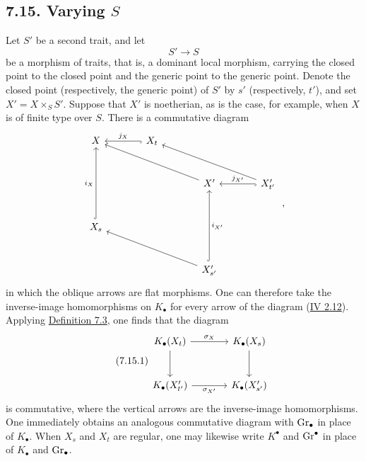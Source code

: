 \subsection*{7.15. Varying $S$}
Let $S'$ be a second trait, and let
\[
S'\longrightarrow S
\]
be a morphism of traits, that is, a dominant local morphism, carrying the
closed point to the closed point and the generic point to the generic point.
Denote the closed point (respectively, the generic point) of $S'$ by $s'$
(respectively, $t'$), and set $X'=X\times_SS'$. Suppose that $X'$ is
noetherian, as is the case, for example, when $X$ is of finite type over $S$.
There is a commutative diagram
\[
\begin{tikzcd}[column sep=large,row sep=large]
X & X_t \arrow[l,hook,"j_X"'] & & \\
& & X' \arrow[ull] & X'_{t'} \arrow[l,hook,"j_{X'}"'] \arrow[ull] \\
X_s \arrow[uu,hook,"i_X"] & & & \\
& & X'_{s'} \arrow[uu,hook,"i_{X'}"'] \arrow[ull] &
\end{tikzcd}
\;,
\]
in which the oblique arrows are flat morphisms. One can therefore take the
inverse-image homomorphisms on $K_\bullet$ for every arrow of the diagram
(\hyperlink{sga6.e04.para.2-12}{IV 2.12}). Applying \hyperlink{sga6.e10.prop.7-3}{Definition 7.3}, one finds that the diagram
\begin{equation}\tag{7.15.1}
\begin{tikzcd}[column sep=large,row sep=large]
K_\bullet(X_t) \arrow[r,"\sigma_X"] \arrow[d] &
K_\bullet(X_s) \arrow[d]\\
K_\bullet(X'_{t'}) \arrow[r,"\sigma_{X'}"'] &
K_\bullet(X'_{s'})
\end{tikzcd}
\end{equation}
is commutative, where the vertical arrows are the inverse-image
homomorphisms. One immediately obtains an analogous commutative diagram with
$\operatorname{Gr}_\bullet$ in place of $K_\bullet$. When $X_s$ and $X_t$ are regular, one
may likewise write $K^\bullet$ and $\operatorname{Gr}^\bullet$ in place of $K_\bullet$ and
$\operatorname{Gr}_\bullet$.












